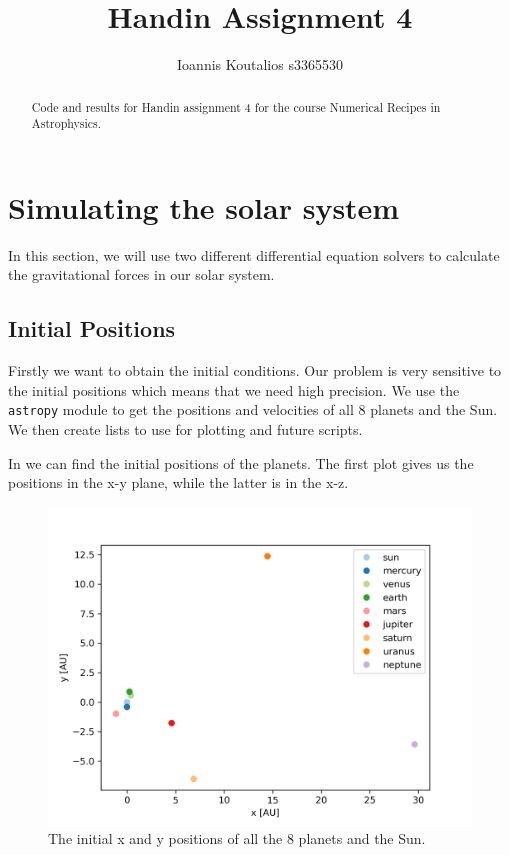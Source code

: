 \documentclass[a4paper,10pt]{article}
\title{Handin Assignment 4}
\author{Ioannis Koutalios s3365530}
\begin{document}
\maketitle


\begin{abstract}
 Code and results for Handin assignment 4 for the course Numerical Recipes in Astrophysics.
\end{abstract}

\section{Simulating the solar system}

In this section, we will use two different differential equation solvers to calculate the gravitational forces in our solar system.

\subsection{Initial Positions}

Firstly we want to obtain the initial conditions. Our problem is very sensitive to the initial positions which means that we need high precision. We use the \texttt{astropy} module to get the positions and velocities of all 8 planets and the Sun. We then create lists to use for plotting and future scripts.



In  we can find the initial positions of the planets. The first plot gives us the positions in the x-y plane, while the latter is in the x-z. 

\begin{figure}[H]
  \centering
  \includegraphics[width=.6\linewidth]{./plots/x-y.png}
  \caption{The initial x and y positions of all the 8 planets and the Sun.}
  \label{fig:x-y}
\end{figure}
\end{document}
